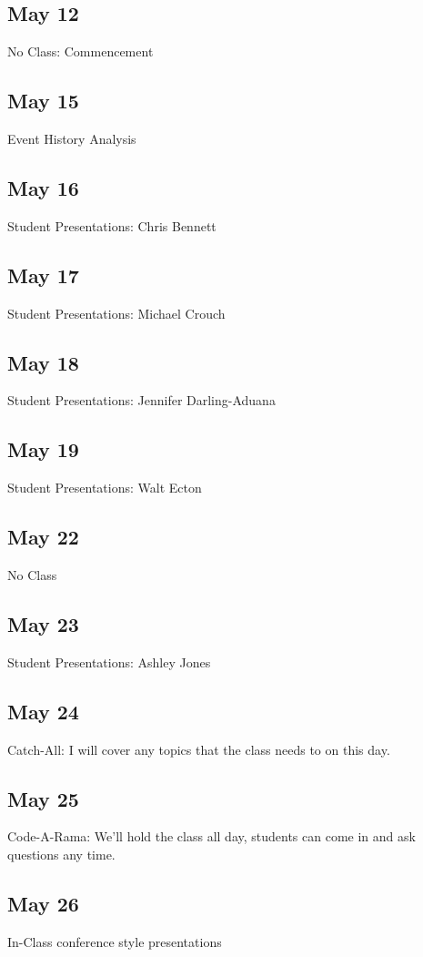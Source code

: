 \documentclass[10pt]{article}
\begin{document}
\subsection{May 12}
\label{sec:may-13}

No Class: Commencement

\subsection{May 15}

Event History Analysis



\subsection{May 16}
Student Presentations: Chris Bennett


\subsection{May 17}
Student Presentations: Michael Crouch


\subsection{May 18}
Student Presentations: Jennifer Darling-Aduana


\subsection{May 19}

Student Presentations: Walt Ecton

\subsection{May 22}
No Class


\subsection{May 23}
Student Presentations: Ashley Jones


\subsection{May 24} 
Catch-All: I will cover any topics that the class needs to on this
day. 


\subsection{May 25}

Code-A-Rama: We'll hold the class all day, students can come in and
ask questions any time. 

\subsection{May 26}

In-Class conference style presentations
\end{document}
